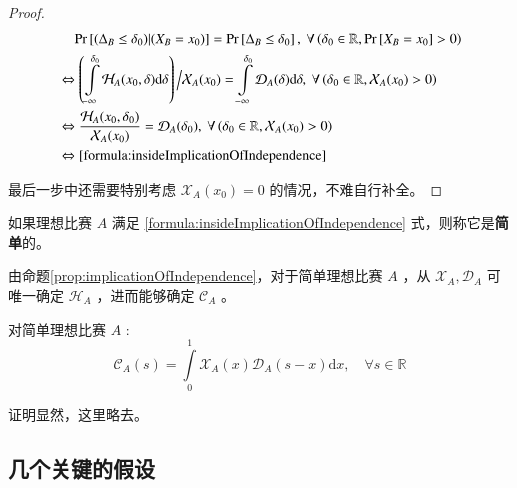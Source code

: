             \begin{proof}
                \begin{align*}
                    &\phantom{\Leftrightarrow\ }\mathrm{Pr}\left[(\Delta_B\leq\delta_0)|(X_B=x_0)\right]=\mathrm{Pr}\left[\Delta_B\leq\delta_0\right],\ \forall \left(\delta_0\in\mathbb{R},\mathrm{Pr}\left[X_B=x_0\right]>0\right) \\
                    &\Leftrightarrow \left(\displaystyle\int\limits_{-\infty}^{\delta_0} \mathcal{H}_A(x_0,\delta)\mathrm{d}\delta\right)\Big/{\mathcal{X}_A(x_0)}=\int\limits_{-\infty}^{\delta_0} \mathcal{D}_A(\delta)\mathrm{d}\delta,\ \forall \left(\delta_0\in\mathbb{R},\mathcal{X}_A(x_0)>0\right)\\
                    &\Leftrightarrow \frac{\mathcal{H}_A(x_0,\delta_0)}{\mathcal{X}_A(x_0)}=\mathcal{D}_A(\delta_0),\ \forall \left(\delta_0\in\mathbb{R},\mathcal{X}_A(x_0)>0\right)\\
                    &\Leftrightarrow \eqref{formula:insideImplicationOfIndependence}
                \end{align*}
                
                最后一步中还需要特别考虑 $\mathcal{X}_A(x_0)=0$ 的情况，不难自行补全。
            \end{proof}

            \begin{definition}[简单理想比赛]
                如果理想比赛 $A$ 满足 \eqref{formula:insideImplicationOfIndependence} 式，则称它是\textbf{简单}的。

                \label{def:simplicityOfContest}
            \end{definition}

            由命题\ref{prop:implicationOfIndependence}，对于简单理想比赛 $A$ ，从 $\mathcal{X}_A,\mathcal{D}_A$ 可唯一确定 $\mathcal{H}_A$ ，进而能够确定 $\mathcal{C}_A$ 。

            \begin{proposition}[简单理想比赛的分数分布函数]
                对简单理想比赛 $A$ :
                $$
                \mathcal{C}_A(s)=\int\limits_{0}^1 \mathcal{X}_A(x)\mathcal{D}_A(s-x) \mathrm{d}x,\quad\forall s\in\mathbb{R}
                $$

                \label{prop:scoreDistributionInSimpleContest}
            \end{proposition}

            证明显然，这里略去。

    \subsection{几个关键的假设}\label{sec:keyAssumptions}

